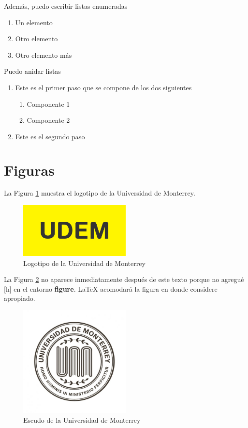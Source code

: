 \documentclass[]{article}
\begin{document}
Además, puedo escribir listas enumeradas
\begin{enumerate}
	\item Un elemento
	\item Otro elemento
	\item Otro elemento más
\end{enumerate}

Puedo anidar listas
\begin{enumerate}
	\item Este es el primer paso que se compone de los dos siguientes
	\begin{enumerate}
		\item Componente 1
		\item Componente 2
	\end{enumerate}
	\item Este es el segundo paso
\end{enumerate}

\section{Figuras}
La Figura \ref{logo} muestra el logotipo de la Universidad de Monterrey.

\begin{figure}[h] \centering 
	\includegraphics[width=0.5\textwidth]{logo_udem}
	\caption{Logotipo de la Universidad de Monterrey}
	\label{logo}
\end{figure}

La Figura \ref{escudo} no aparece inmediatamente después de este texto porque no agregué [h] en el entorno \textbf{figure}. \LaTeX \: acomodará la figura en donde considere apropiado.
\begin{figure} \centering 
	\includegraphics[width=0.5\textwidth]{escudo_udem}
	\caption{Escudo de la Universidad de Monterrey}
	\label{escudo}
\end{figure}
\end{document}
